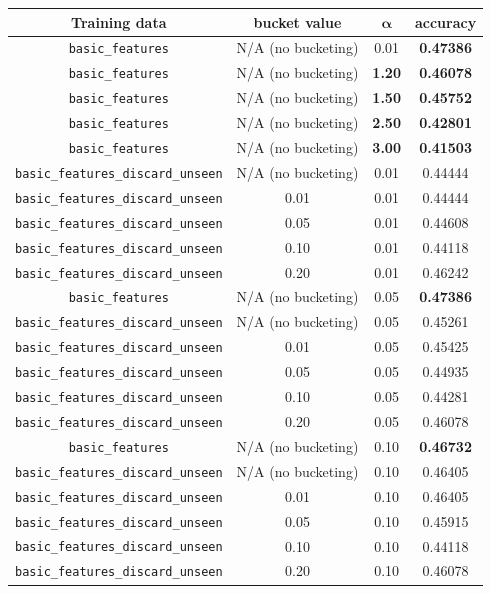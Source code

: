 \documentclass{article}
\begin{document}
{\small\begin{tabular}{|c|c|c|c|}\hline
Training data & bucket value & $\bm{\alpha}$ & accuracy\\\hline
\texttt{basic\_features} & N/A (no bucketing) & 0.01 & \textbf{0.47386}\\
\texttt{basic\_features} & N/A (no bucketing) & \textbf{1.20} & \textbf{0.46078}\\
\texttt{basic\_features} & N/A (no bucketing) & \textbf{1.50} & \textbf{0.45752}\\
\texttt{basic\_features} & N/A (no bucketing) & \textbf{2.50} & \textbf{0.42801}\\\hline\hline
\texttt{basic\_features} & N/A (no bucketing) & \textbf{3.00} & \textbf{0.41503}\\\hline\hline

\texttt{basic\_features\_discard\_unseen} & N/A (no bucketing) & 0.01 & 0.44444\\
\texttt{basic\_features\_discard\_unseen} & 0.01 & 0.01 & 0.44444\\
\texttt{basic\_features\_discard\_unseen} & 0.05 & 0.01 & 0.44608\\
\texttt{basic\_features\_discard\_unseen} & 0.10 & 0.01 & 0.44118\\
\texttt{basic\_features\_discard\_unseen} & 0.20 & 0.01 & 0.46242\\\hline

\texttt{basic\_features} & N/A (no bucketing) & 0.05 & \textbf{0.47386}\\
\texttt{basic\_features\_discard\_unseen} & N/A (no bucketing) & 0.05 & 0.45261\\
\texttt{basic\_features\_discard\_unseen} & 0.01 & 0.05 & 0.45425\\
\texttt{basic\_features\_discard\_unseen} & 0.05 & 0.05 & 0.44935\\
\texttt{basic\_features\_discard\_unseen} & 0.10 & 0.05 & 0.44281\\
\texttt{basic\_features\_discard\_unseen} & 0.20 & 0.05 & 0.46078\\\hline

\texttt{basic\_features} & N/A (no bucketing) & 0.10 & \textbf{0.46732}\\
\texttt{basic\_features\_discard\_unseen} & N/A (no bucketing) & 0.10 & 0.46405\\
\texttt{basic\_features\_discard\_unseen} & 0.01 & 0.10 & 0.46405\\
\texttt{basic\_features\_discard\_unseen} & 0.05 & 0.10 & 0.45915\\
\texttt{basic\_features\_discard\_unseen} & 0.10 & 0.10 & 0.44118\\
\texttt{basic\_features\_discard\_unseen} & 0.20 & 0.10 & 0.46078\\\hline
\end{tabular}}\par\bigskip
\end{document}
